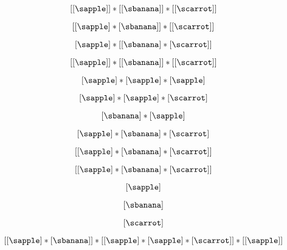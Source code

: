 {\begin{forslides}
\begin{equation}\label{eq:fruit-sum-7}
 [ [ \sapple ] ] * [[ \sbanana ] ]  *  [[\scarrot]]
\end{equation}

\begin{equation}\label{eq:fruit-sum-7'}
 [ [ \sapple ]  * [ \sbanana ] ] *  [[\scarrot]]
\end{equation}

\begin{equation}\label{eq:fruit-sum-8}
 [ \sapple ]   *  [[ \sbanana ]  * [ \scarrot ]]
\end{equation}

\begin{equation}\label{eq:fruit-sum-9}
 [[ \sapple ]]  * [[ \sbanana ]] *  [[ \scarrot ]]
\end{equation}


\begin{equation}\label{eq:fruit-sum-10}
 [ \sapple ]   *  [ \sapple ]  *  [\sapple]  
\end{equation}

\begin{equation}\label{eq:fruit-sum-11}
 [ \sapple ]   *  [ \sapple ]  * [ \scarrot ]
\end{equation}

\begin{equation}\label{eq:fruit-sum-12}
[\sbanana ] * [ \sapple ]   
\end{equation}

\begin{equation}\label{eq:fruit-sum-13}
 [ \sapple ]   *  [ \sbanana ]  *  [ \scarrot ] 
\end{equation}

\begin{equation}\label{eq:fruit-sum-14}
[ [ \sapple ]   *  [ \sbanana ]  *  [ \scarrot ] ]
\end{equation}

\begin{equation}\label{eq:fruit-sum-15}
 [ [ \sapple ]  *  [\sbanana]  *  [\scarrot ]  ]
\end{equation}

\begin{equation}\label{eq:fruit-sum-16}
 [ \sapple ] 
\end{equation}

\begin{equation}\label{eq:fruit-sum-17}
 [ \sbanana ] 
\end{equation}

\begin{equation}\label{eq:fruit-sum-18}
 [ \scarrot ] 
\end{equation}

\begin{equation}\label{eq:fruit-sum-20}
 [ [ \sapple ]   * [ \sbanana] ] *  [[ \sapple ]   *  [ \sapple ] *  [\scarrot ] ]   *  [[ \sapple ] ]
\end{equation}



\end{forslides}

}



